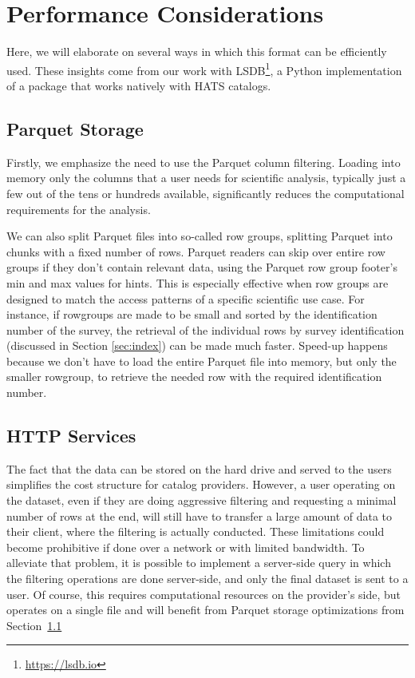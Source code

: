 \documentclass[11pt,a4paper]{ivoa}
\begin{document}
\section{Performance Considerations}
Here, we will elaborate on several ways in which this format can be efficiently used. These insights come from our work with LSDB\footnote{\url{https://lsdb.io}}, a Python implementation of a package that works natively with HATS catalogs. \par

\subsection{Parquet Storage}\label{sec:parquetPerformance}
Firstly, we emphasize the need to use the Parquet column filtering. 
Loading into memory only the columns that a user needs for scientific analysis, typically just a few out of the tens or hundreds available, significantly reduces the computational requirements for the analysis.  \par 

We can also split Parquet files into so-called row groups, splitting Parquet into chunks with a fixed number of rows. 
Parquet readers can skip over entire row groups if they don't contain relevant data, using the Parquet row group footer's min and max values for hints. 
This is especially effective when row groups are designed to match the access patterns of a specific scientific use case. 
For instance, if rowgroups are made to be small and sorted by the identification number of the survey, the retrieval of the individual rows by survey identification (discussed in Section  \ref{sec:index}) can be made much faster. 
Speed-up happens because we don't have to load the entire Parquet file into memory, but only the smaller rowgroup, to retrieve the needed row with the required identification number.\par 

\subsection{HTTP Services}
The fact that the data can be stored on the hard drive and served to the users simplifies the cost structure for catalog providers. 
However, a user operating on the dataset, even if they are doing aggressive filtering and requesting a minimal number of rows at the end, will still have to transfer a large amount of data to their client, where the filtering is actually conducted. 
These limitations could become prohibitive if done over a network or with limited bandwidth. 
To alleviate that problem, it is possible to implement a server-side query in which the filtering operations are done server-side, and only the final dataset is sent to a user. 
Of course, this requires computational resources on the provider's side, but operates on a single file and will benefit from Parquet storage optimizations from Section~\ref{sec:parquetPerformance}
\end{document}
